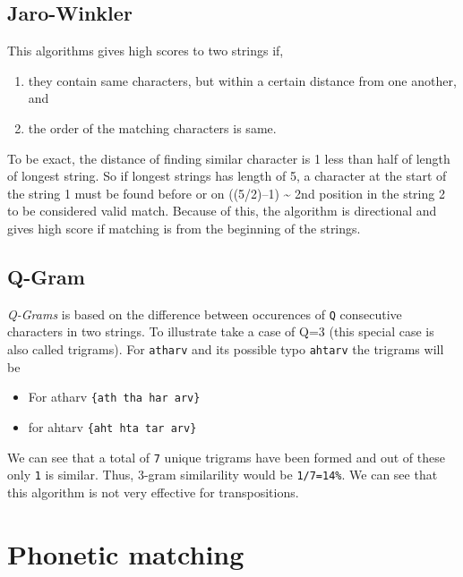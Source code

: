 \documentclass[
]{book}
\providecommand{\tightlist}{%
  \setlength{\itemsep}{0pt}\setlength{\parskip}{0pt}}
\begin{document}
\hypertarget{jaro-winkler}{%
\subsection{Jaro-Winkler}\label{jaro-winkler}}

This algorithms gives high scores to two strings if,

\begin{enumerate}
\def\labelenumi{\arabic{enumi}.}
\tightlist
\item
  they contain same characters, but within a certain distance from one another, and
\item
  the order of the matching characters is same.
\end{enumerate}

To be exact, the distance of finding similar character is 1 less than half of length of longest string. So if longest strings has length of 5, a character at the start of the string 1 must be found before or on ((5/2)--1) \textasciitilde{} 2nd position in the string 2 to be considered valid match. Because of this, the algorithm is directional and gives high score if matching is from the beginning of the strings.

\hypertarget{q-gram}{%
\subsection{Q-Gram}\label{q-gram}}

\emph{Q-Grams} is based on the difference between occurences of \texttt{Q} consecutive characters in two strings. To illustrate take a case of Q=3 (this special case is also called trigrams). For \texttt{atharv} and its possible typo \texttt{ahtarv} the trigrams will be

\begin{itemize}
\tightlist
\item
  For atharv \texttt{\{ath\ tha\ har\ arv\}}
\item
  for ahtarv \texttt{\{aht\ hta\ tar\ arv\}}
\end{itemize}

We can see that a total of \texttt{7} unique trigrams have been formed and out of these only \texttt{1} is similar. Thus, 3-gram similarility would be \texttt{1/7=14\%}. We can see that this algorithm is not very effective for transpositions.

\hypertarget{phonetic-matching}{%
\section{Phonetic matching}\label{phonetic-matching}}
\end{document}
